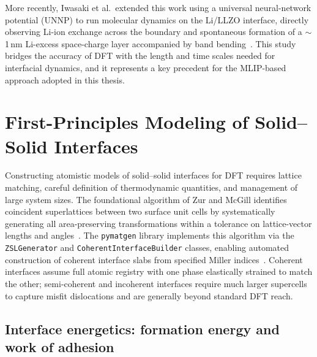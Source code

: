 \documentclass[12pt,a4paper,oneside]{book}
\begin{document}
More recently, Iwasaki et al.\ extended this work using a universal neural-network potential (UNNP) to run molecular dynamics on the Li/LLZO interface, directly observing Li-ion exchange across the boundary and spontaneous formation of a $\sim$1\,nm Li-excess space-charge layer accompanied by band bending~\cite{Iwasaki2024}. This study bridges the accuracy of DFT with the length and time scales needed for interfacial dynamics, and it represents a key precedent for the MLIP-based approach adopted in this thesis.

\section{First-Principles Modeling of Solid--Solid Interfaces}
\label{sec:dft_interfaces}

Constructing atomistic models of solid--solid interfaces for DFT requires lattice matching, careful definition of thermodynamic quantities, and management of large system sizes. The foundational algorithm of Zur and McGill identifies coincident superlattices between two surface unit cells by systematically generating all area-preserving transformations within a tolerance on lattice-vector lengths and angles~\cite{Zur1984}. The \texttt{pymatgen} library implements this algorithm via the \texttt{ZSLGenerator} and \texttt{CoherentInterfaceBuilder} classes, enabling automated construction of coherent interface slabs from specified Miller indices~\cite{Ong2013}. Coherent interfaces assume full atomic registry with one phase elastically strained to match the other; semi-coherent and incoherent interfaces require much larger supercells to capture misfit dislocations and are generally beyond standard DFT reach.

\subsection{Interface energetics: formation energy and work of adhesion}
\end{document}
